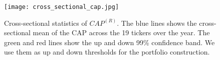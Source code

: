 \begin{figure}
    \centering
    \texttt{[image: cross\_sectional\_cap.jpg]}
    \caption{Cross-sectional statistics of $CAP^{(R)}$. The blue lines shows the cross-sectional mean of the CAP across the 19 tickers over the year. The green and red lines show the up and down 99\% confidence band. We use them as up and down thresholds for the portfolio construction. }
    \label{fig:cross-sec stats}
\end{figure}


%
%
%
%
%
%
% 
%
%
%
%
